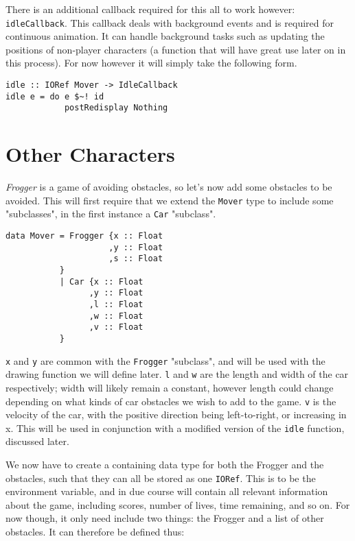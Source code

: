 \documentclass[12pt, a4paper]{report}
\begin{document}
There is an additional callback required for this all to work however: \verb|idleCallback|.
This callback deals with background events and is required for continuous animation.
It can handle background tasks such as updating the positions of non-player characters (a function that will have great use later on in this process).
For now however it will simply take the following form.

\begin{lstlisting}
idle :: IORef Mover -> IdleCallback
idle e = do e $~! id
            postRedisplay Nothing
\end{lstlisting}

\section{Other Characters}

\textit{Frogger} is a game of avoiding obstacles, so let's now add some obstacles to be avoided.
This will first require that we extend the \verb|Mover| type to include some "subclasses", in the first instance a \verb|Car| "subclass".

\begin{lstlisting}
data Mover = Frogger {x :: Float
                     ,y :: Float
                     ,s :: Float
           }
           | Car {x :: Float
                 ,y :: Float
                 ,l :: Float
                 ,w :: Float
                 ,v :: Float
           }
\end{lstlisting}

\verb|x| and \verb|y| are common with the \verb|Frogger| "subclass", and will be used with the drawing function we will define later.
\verb|l| and \verb|w| are the length and width of the car respectively; width will likely remain a constant, however length could change depending on what kinds of car obstacles we wish to add to the game.
\verb|v| is the velocity of the car, with the positive direction being left-to-right, or increasing in x.
This will be used in conjunction with a modified version of the \verb|idle| function, discussed later.


We now have to create a containing data type for both the Frogger and the obstacles, such that they can all be stored as one \verb|IORef|.
This is to be the environment variable, and in due course will contain all relevant information about the game, including scores, number of lives, time remaining, and so on.
For now though, it only need include two things: the Frogger and a list of other obstacles.
It can therefore be defined thus:
\end{document}
